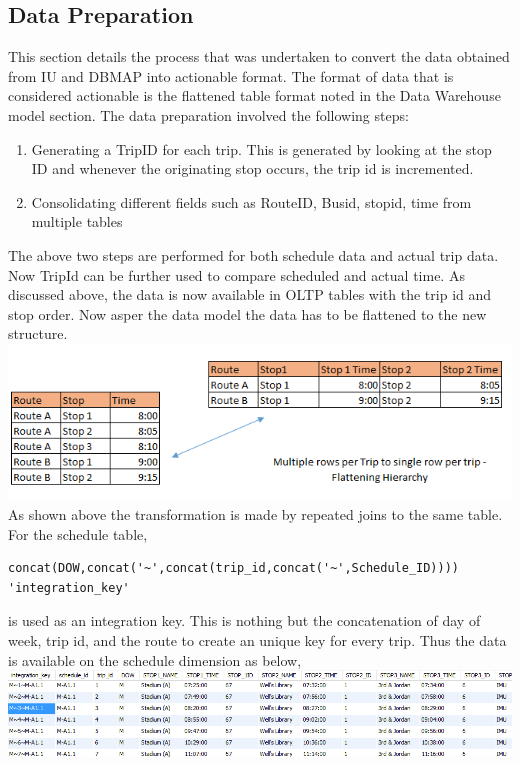 \documentclass[12pt]{article}\usepackage[]{graphicx}\usepackage[]{color}
\begin{document}
\subsection{Data Preparation}
This section details the process that was undertaken to convert the data obtained from IU and DBMAP into actionable format. The format of data that is considered actionable is the flattened table format noted in the Data Warehouse model section.
The data preparation involved the following steps:
\begin{enumerate}
\item Generating a TripID for each trip. This is generated by looking at the stop ID and whenever the originating stop occurs, the trip id is incremented.
\item Consolidating different fields such as RouteID, Busid, stopid, time from multiple tables
\end{enumerate}
The above two steps are performed for both schedule data and actual trip data. Now TripId can be further used to compare scheduled and actual time.
As discussed above, the data is now available in OLTP tables with the trip id and stop order. Now asper the data model the data has to be flattened to the new structure.\\
\includegraphics[scale=0.6]{resources/hierarchy}\\[1cm] 
As shown above the transformation is made by repeated joins to the same table. For the schedule table,
\begin{verbatim}
concat(DOW,concat('~',concat(trip_id,concat('~',Schedule_ID)))) 'integration_key' 
\end{verbatim}
is used as an integration key. This is nothing but the concatenation of day of week, trip id, and the route to create an unique key for every trip. Thus the data is available on the schedule dimension as below,\\
\includegraphics[scale=0.6]{resources/wt1}\\[1cm] 
\end{document}
